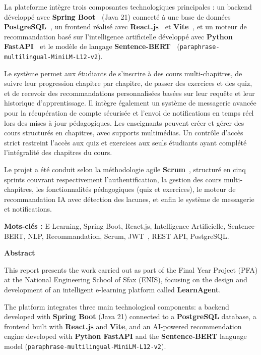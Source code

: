 \documentclass[12pt,a4paper]{report}
\begin{document}
La plateforme intègre trois composantes technologiques principales : un backend développé avec \textbf{Spring Boot~\cite{spring}} (Java 21) connecté à une base de données \textbf{PostgreSQL~\cite{postgresql}}, un frontend réalisé avec \textbf{React.js~\cite{react}} et \textbf{Vite~\cite{vite}}, et un moteur de recommandation basé sur l'intelligence artificielle développé avec \textbf{Python FastAPI~\cite{fastapi}} et le modèle de langage \textbf{Sentence-BERT~\cite{sbert}} (\texttt{paraphrase-multilingual-MiniLM-L12-v2}).

Le système permet aux étudiants de s'inscrire à des cours multi-chapitres, de suivre leur progression chapitre par chapitre, de passer des exercices et des quiz, et de recevoir des recommandations personnalisées basées sur leur requête et leur historique d'apprentissage. Il intègre également un système de messagerie avancée pour la récupération de compte sécurisée et l'envoi de notifications en temps réel lors des mises à jour pédagogiques. Les enseignants peuvent créer et gérer des cours structurés en chapitres, avec supports multimédias. Un contrôle d'accès strict restreint l'accès aux quiz et exercices aux seuls étudiants ayant complété l'intégralité des chapitres du cours.

Le projet a été conduit selon la méthodologie agile \textbf{Scrum}~\cite{scrum}, structuré en cinq sprints couvrant respectivement l'authentification, la gestion des cours multi-chapitres, les fonctionnalités pédagogiques (quiz et exercices), le moteur de recommandation IA avec détection des lacunes, et enfin le système de messagerie et notifications.

\textbf{Mots-clés :} E-Learning, Spring Boot, React.js, Intelligence Artificielle, Sentence-BERT, NLP, Recommandation, Scrum, JWT~\cite{jwt}, REST API, PostgreSQL.

\vspace{1cm}

\noindent\textbf{Abstract}

\noindent This report presents the work carried out as part of the Final Year Project (PFA) at the National Engineering School of Sfax (ENIS), focusing on the design and development of an intelligent e-learning platform called \textbf{LearnAgent}.

The platform integrates three main technological components: a backend developed with \textbf{Spring Boot} (Java 21) connected to a \textbf{PostgreSQL} database, a frontend built with \textbf{React.js} and \textbf{Vite}, and an AI-powered recommendation engine developed with \textbf{Python FastAPI} and the \textbf{Sentence-BERT} language model (\texttt{paraphrase-multilingual-MiniLM-L12-v2}).
\end{document}
